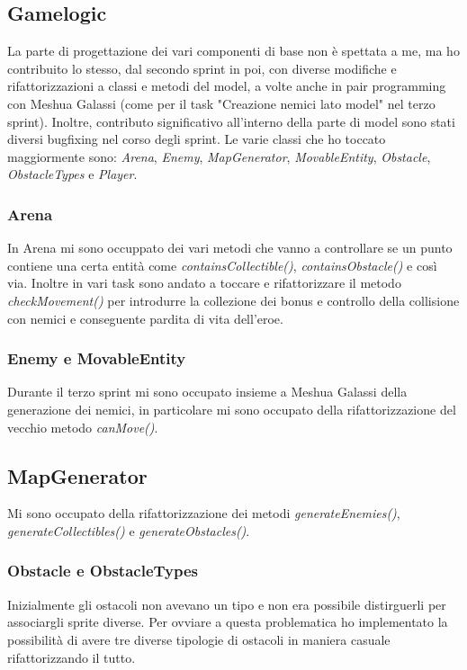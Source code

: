 \subsection{Gamelogic}
La parte di progettazione dei vari componenti di base non è spettata a me, ma ho contribuito lo stesso, dal secondo sprint in poi, con diverse modifiche e rifattorizzazioni a classi e metodi del model, a volte anche in pair programming con Meshua Galassi (come per il task "Creazione nemici lato model" nel terzo sprint).
Inoltre, contributo significativo all'interno della parte di model sono stati diversi bugfixing nel corso degli sprint.
Le varie classi che ho toccato maggiormente sono: \textit{Arena}, \textit{Enemy}, \textit{MapGenerator}, \textit{MovableEntity}, \textit{Obstacle}, \textit{ObstacleTypes} e \textit{Player}.

\subsubsection{Arena}
In Arena mi sono occuppato dei vari metodi che vanno a controllare se un punto contiene una certa entità come \textit{containsCollectible()}, \textit{containsObstacle()} e così via.
Inoltre in vari task sono andato a toccare e rifattorizzare il metodo \textit{checkMovement()} per introdurre la collezione dei bonus e controllo della collisione con nemici e conseguente pardita di vita dell'eroe.

\subsubsection{Enemy e MovableEntity}
Durante il terzo sprint mi sono occupato insieme a Meshua Galassi della generazione dei nemici, in particolare mi sono occupato della rifattorizzazione del vecchio metodo \textit{canMove()}.

\subsection{MapGenerator}
Mi sono occupato della rifattorizzazione dei metodi \textit{generateEnemies()}, \textit{generateCollectibles()} e \textit{generateObstacles()}.

\subsubsection{Obstacle e ObstacleTypes}
Inizialmente gli ostacoli non avevano un tipo e non era possibile distirguerli per associargli sprite diverse.
Per ovviare a questa problematica ho implementato la possibilità di avere tre diverse tipologie di ostacoli in maniera casuale rifattorizzando il tutto.


